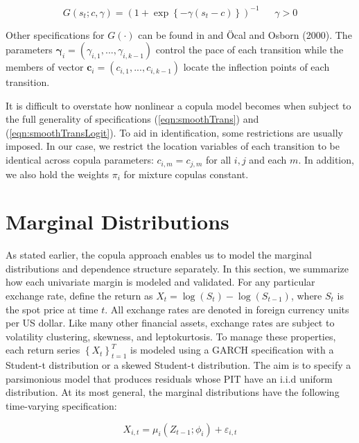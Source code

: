 \documentclass[12pt]{article}
\begin{document}
\begin{equation} \label{eqn:smoothTransLogit}
	G\left(s_{t}; c, \gamma\right) = \left(1+\exp\left\{ -\gamma \left(s_{t}-c\right) \right\}\right)^{-1}~~~~~~~\gamma > 0
\end{equation}

Other specifications for $G\left( \cdot \right) $ can be found in \cite{Dijk_and_Frances_1999} and \cite{Ocal_and_Osborn_2000} \"{O}cal and Osborn (2000). The parameters $\boldsymbol{\gamma}_{i} = \left(\gamma_{i,1},...,\gamma_{i,k-1}\right)$ control the pace of each transition while the members of vector $\mathbf{c}_{i} = \left(c_{i,1},...,c_{i,k-1}\right)$ locate the inflection points of each transition.

It is difficult to overstate how nonlinear a copula model becomes when subject to the full generality of specifications (\ref{eqn:smoothTrans}) and (\ref{eqn:smoothTransLogit}). To aid in identification, some restrictions are usually imposed. In our case, we restrict the location variables of each transition to be identical across copula parameters: $c_{i,m}=c_{j,m}$ for all $i,j$ and each $m$. In addition, we also hold the weights $\pi_{i}$ for mixture copulas constant.

\section{Marginal Distributions}

As stated earlier, the copula approach enables us to model the marginal distributions and dependence structure separately. In this section, we summarize how each univariate margin is modeled and validated. For any particular exchange rate, define the return as $X_{t} = \log \left(S_{t}\right) - \log\left(S_{t-1}\right)$, where $S_{t}$ is the spot price at time $t$. All exchange rates are denoted in foreign currency units per US dollar. Like many other financial assets, exchange rates are subject to volatility clustering, skewness, and leptokurtosis. To manage these properties, each return series $\left\{X_{t}\right\}_{t=1}^{T}$ is modeled using a GARCH specification with a Student-t distribution or a skewed Student-t distribution. The aim is to specify a parsimonious model that produces residuals whose PIT have an i.i.d uniform distribution. At its most general, the marginal distributions have the following time-varying specification:

\begin{equation} \label{eqn:marginalModel}
	X_{i,t} = \mu_{i}\left(Z_{t - 1}; \phi_{i}\right) + \varepsilon_{i,t}
\end{equation}
\end{document}
